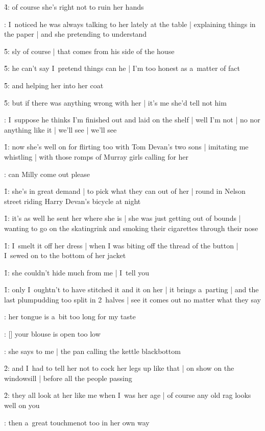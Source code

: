 \f4:
of course she's right not to ruin her hands

:
I~noticed he was always talking to her lately at the table |
explaining things in the paper |
and she pretending to understand

\f5:
sly of course |
that comes from his side of the house

\f5:
he can't say I~pretend things can he |
I'm too honest as a~matter of fact

\f5:
and helping her into her coat

\f5:
but if there was anything wrong with her |
it's me she'd tell not him

:
I~suppose he thinks I'm finished out and laid on the shelf |
well I'm not |
no nor anything like it |
we'll see |
we'll see

\f1:
now she's well on for flirting too with Tom Devan's two sons |
imitating me whistling |
with those romps of Murray girls calling for her

:
can Milly come out please

\f1:
she's in great demand |
to pick what they can out of her |
round in Nelson street riding Harry Devan's bicycle at night

\f1:
it's as well he sent her where she is |
she was just getting out of bounds |
wanting to go on the skatingrink
and smoking their cigarettes through their nose

\f1:
I~smelt it off her dress |
when I was biting off the thread of the button |
I~sewed on to the bottom of her jacket

\f1:
she couldn't hide much from me |
I~tell you

\f1:
only I~oughtn't to have stitched it and it on her |
it brings a~parting |
and the last plumpudding too split in 2~halves |
see it comes out no matter what they say

:
her tongue is a~bit too long for my taste

:
[\milly] your blouse is open too low

:
she says to me |
the pan calling the kettle blackbottom

\f2:
and I~had to tell her not to cock her legs up like that |
on show on the windowsill |
before all the people passing

\f2:
they all look at her like me when I~was her age |
of course any old rag looks well on you

:
then a~great touchmenot too in her own way

